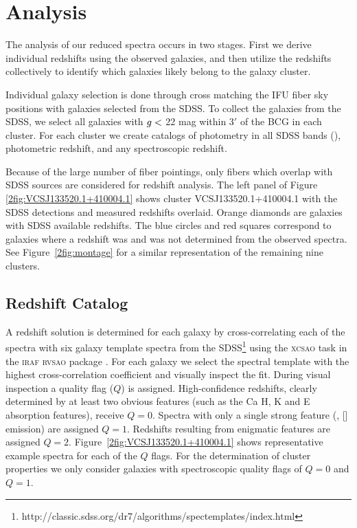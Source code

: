\section{Analysis}\label{2sec:analysis} 
The analysis of our reduced spectra occurs in two stages. First we derive individual redshifts using the observed galaxies, and then utilize the redshifts collectively to identify which galaxies likely belong to the galaxy cluster.

Individual galaxy selection is done through cross matching the IFU fiber sky positions with galaxies selected from the SDSS. To collect the galaxies from the SDSS, we select all galaxies with $\hbox{$g$} <$ 22 mag within $3'$ of the BCG in each cluster. For each cluster we create catalogs of photometry in all SDSS bands (\sdssu\sdssg\sdssr\sdssi\sdssz), photometric redshift, and any spectroscopic redshift.

Because of the large number of fiber pointings, only fibers which overlap with SDSS sources are considered for redshift analysis. The left panel of Figure \ref{2fig:VCSJ133520.1+410004.1} shows cluster VCSJ133520.1+410004.1 with the SDSS detections and measured redshifts overlaid. Orange diamonds are galaxies with SDSS available redshifts. The blue circles and red squares correspond to galaxies where a redshift was and was not determined from the observed spectra. See Figure~\ref{2fig:montage} for a similar representation of the remaining nine clusters.

\subsection{Redshift Catalog}\label{2sec:redshift catalog} 
A redshift solution is determined for each galaxy by cross-correlating \citep{Tonry1979} each of the spectra with six galaxy template spectra from the SDSS\footnote{http://classic.sdss.org/dr7/algorithms/spectemplates/index.html} using the \textsc{xcsao} task in the \textsc{iraf} \textsc{rvsao} package \citep{Kurtz1992, Kurtz1998}. For each galaxy we select the spectral template with the highest cross-correlation coefficient and visually inspect the fit. During visual inspection a quality flag ($Q$) is assigned. High-confidence redshifts, clearly determined by at least two obvious features (such as the Ca H, K and E absorption features), receive $Q=0$. Spectra with only a single strong feature (\eg, \hbox{[]} emission) are assigned $Q=1$. Redshifts resulting from enigmatic features are assigned $Q=2$. Figure~\ref{2fig:VCSJ133520.1+410004.1} shows representative example spectra for each of the $Q$ flags. For the determination of cluster properties we only consider galaxies with spectroscopic quality flags of $Q=0$ and $Q=1$. 


